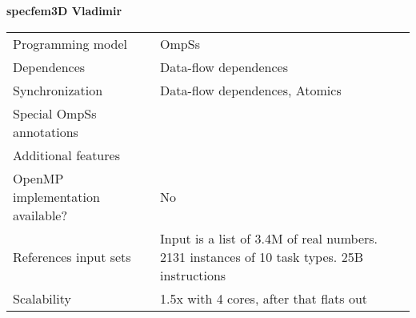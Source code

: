 \section*{}
\label{specfem3D_vladimir}
\centering
\Huge
\textbf{specfem3D Vladimir}

\begin{table}[h!]
  \large
  \centering
  \begin{tabular}{|l|l|}
    \hline
    Programming model                & OmpSs \\
    Dependences                      & Data-flow dependences \\
    Synchronization                  & Data-flow dependences, Atomics \\
    Special OmpSs annotations        &  \\
    Additional features              &  \\
    OpenMP implementation available? & No \\
    References input sets            & Input is a list of 3.4M of real numbers. 2131 instances of 10 task types. 25B instructions \\
    Scalability                      & 1.5x with 4 cores, after that flats out \\
    \hline
  \end{tabular}
\end{table}

\newpage
